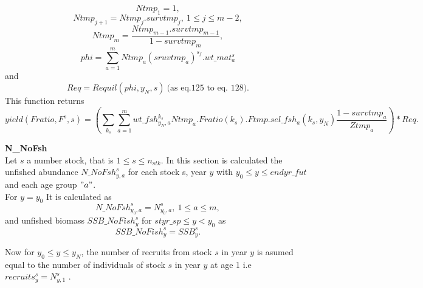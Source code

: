 \documentclass{article}
\begin{document}
\begin{equation}
    Ntmp_1=1,
\end{equation}
\begin{equation}
    Ntmp_{j+1}=Ntmp_j.survtmp_j, \ 1\leq j \leq m-2,
\end{equation}
\begin{equation}
    Ntmp_m=\dfrac{Ntmp_{m-1}.survtmp_{m-1}}{1-survtmp_m},
\end{equation}
\begin{equation}
    phi=\sum_{a=1}^m Ntmp_a(sruvtmp_a)^{s_f}.wt\_mat^s_a
\end{equation}
and
\begin{equation}
    Req=Requil(phi,y_N,s) \  \text{(as eq.125 to eq. 128)}.
\end{equation}
This function returns
\begin{equation}
    yield(Fratio, F^s,s)=\left(\sum_{k_s}\sum_{a=1}^m wt\_fsh^{k_s}_{y_N,a}Ntmp_a.Fratio(k_s).Ftmp.sel\_fsh_a(k_s,y_N)\dfrac{1-survtmp_a}{Ztmp_a}\right)*Req.
\end{equation}

\textbf{N\_NoFsh}\\
Let $s$ a number stock,  that is $1\leq s \leq n_{stk}$. In this section is calculated the unfished abundance $N\_NoFsh^s_{y,a}$ for each stock s, year $y$ with $y_0\leq y \leq endyr\_fut$ and each age group $"a"$. \\

For $y=y_0$ It is calculated as 
\begin{equation}
N\_NoFsh^s_{y_0,a}=N^s_{y_0,a}, \ 1\leq a \leq m,
\end{equation}
and unfished biomass $SSB\_NoFish^s_y$ for $styr\_sp \leq y < y_0$ as
\begin{equation}
    SSB\_NoFish^s_y=SSB^s_{y}.
\end{equation}


Now for $y_0\leq y \leq y_N$, the number of recruits from stock $s$ in year $y$ is asumed equal to the number of individuals of stock $s$ in year $y$ at age 1 i.e $recruits^s_y=N^s_{y,1}$ .\\ 
\end{document}
